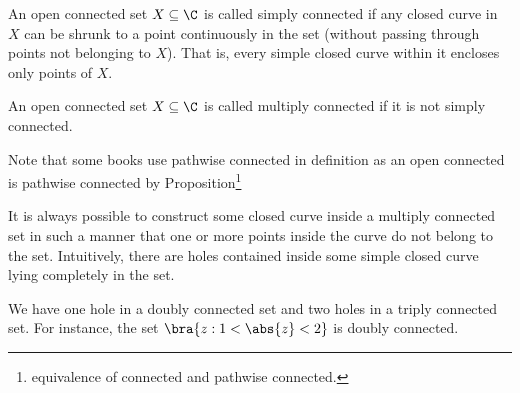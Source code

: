 

\begin{definition}
An open connected set $X\subseteq \C$ is called simply connected if any closed curve in $X$ can be shrunk to a point continuously in the set (without passing through points not belonging to $X$). That is, every simple closed curve within it encloses only points of $X$.

An open connected set $X\subseteq \C$ is called multiply connected if it is not simply connected.
\end{definition}

\begin{remark}
Note that some books use pathwise connected in definition as an open connected is pathwise connected by Proposition\footnote{equivalence of connected and pathwise connected.}

It is always possible to construct some closed curve inside a multiply connected set in such a manner that one or more points inside the curve do not belong to the set. Intuitively, there are holes contained inside some simple closed curve lying completely in the set.

We have one hole in a doubly connected set and two holes in a triply connected set. For instance, the set $\bra{z:1<\abs{z}<2}$ is doubly connected.
\end{remark}



